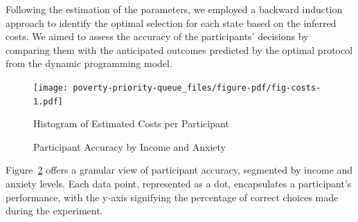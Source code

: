 \documentclass[
]{report}
\begin{document}
Following the estimation of the parameters, we employed a backward
induction approach to identify the optimal selection for each state
based on the inferred costs. We aimed to assess the accuracy of the
participants' decisions by comparing them with the anticipated outcomes
predicted by the optimal protocol from the dynamic programming model.

\begin{figure}

{\centering \texttt{[image: poverty-priority-queue\_files/figure-pdf/fig-costs-1.pdf]}

}

\caption{\label{fig-costs}Histogram of Estimated Costs per Participant}

\end{figure}

\begin{figure}

\begin{minipage}[t]{0.50\linewidth}

{\centering 


}

\end{minipage}%
%
\begin{minipage}[t]{0.50\linewidth}

{\centering 


}

\end{minipage}%

\caption{\label{fig-accuracy-results}Participant Accuracy by Income and
Anxiety}

\end{figure}

Figure~\ref{fig-accuracy-results} offers a granular view of participant
accuracy, segmented by income and anxiety levels. Each data point,
represented as a dot, encapsulates a participant's performance, with the
y-axis signifying the percentage of correct choices made during the
experiment.
\end{document}
